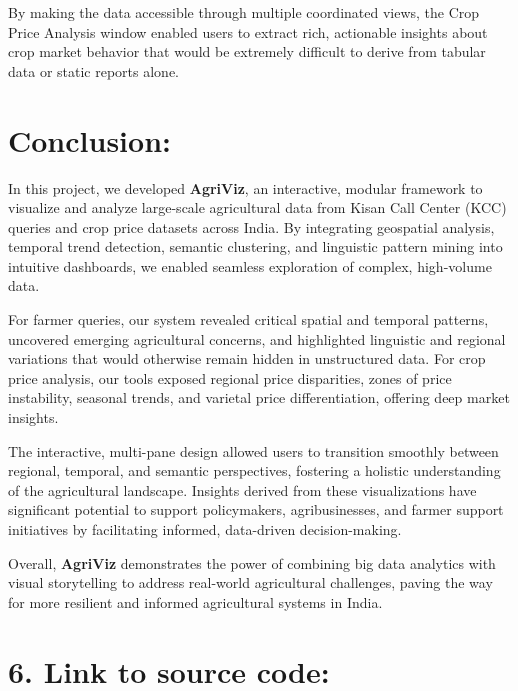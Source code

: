 \documentclass[a4paper, 12pt]{article}
\begin{document}
\begin{enumerate}
\end{enumerate}

By making the data accessible through multiple coordinated views, the Crop Price Analysis window enabled users to extract rich, actionable insights about crop market behavior that would be extremely difficult to derive from tabular data or static reports alone.


\noindent\section{Conclusion:}


In this project, we developed \textbf{AgriViz}, an interactive, modular framework to visualize and analyze large-scale agricultural data from Kisan Call Center (KCC) queries and crop price datasets across India. By integrating geospatial analysis, temporal trend detection, semantic clustering, and linguistic pattern mining into intuitive dashboards, we enabled seamless exploration of complex, high-volume data.

For farmer queries, our system revealed critical spatial and temporal patterns, uncovered emerging agricultural concerns, and highlighted linguistic and regional variations that would otherwise remain hidden in unstructured data. For crop price analysis, our tools exposed regional price disparities, zones of price instability, seasonal trends, and varietal price differentiation, offering deep market insights.

The interactive, multi-pane design allowed users to transition smoothly between regional, temporal, and semantic perspectives, fostering a holistic understanding of the agricultural landscape. Insights derived from these visualizations have significant potential to support policymakers, agribusinesses, and farmer support initiatives by facilitating informed, data-driven decision-making.

Overall, \textbf{AgriViz} demonstrates the power of combining big data analytics with visual storytelling to address real-world agricultural challenges, paving the way for more resilient and informed agricultural systems in India.

\noindent\section*{6. Link to source code:}
\end{document}
